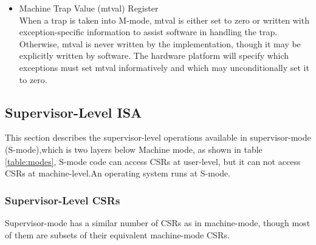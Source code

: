 \documentclass[../main.tex]{subfiles}
\begin{document}
\begin{itemize}
    \item Machine Trap Value (mtval) Register\\
        When a trap is taken into M-mode, mtval is either set to zero or written with exception-specific information to assist software in handling the trap. Otherwise, mtval is never written by the implementation, though it may be explicitly written by software. The hardware platform will specify which exceptions must set mtval informatively and which may unconditionally set it to zero.
\end{itemize}
\subsection{Supervisor-Level ISA}
This section describes the supervisor-level operations available in supervisor-mode (S-mode),which is two layers below Machine mode, as shown in table \ref{table:modes}, S-mode code can access CSRs at user-level, but it can not access CSRs at machine-level.An operating system runs at S-mode.

\subsubsection{Supervisor-Level CSRs}
Supervisor-mode has a similar number of CSRs as in machine-mode, though most of them are subsets of their equivalent machine-mode CSRs.
\end{document}
